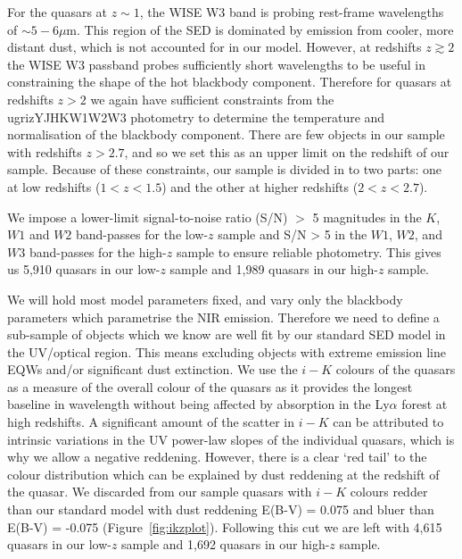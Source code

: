 For the quasars at $z \sim 1$, the WISE W3 band is probing rest-frame wavelengths of $\sim5-6\mu$m. 
This region of the \ac{SED} is dominated by emission from cooler, more distant dust, which is not accounted for in our model.
However, at redshifts $z \gtrsim 2$ the WISE W3 passband probes sufficiently short wavelengths to be useful in constraining the shape of the hot blackbody component. 
Therefore for quasars at redshifts $z > 2$ we again have sufficient constraints from the ugrizYJHKW1W2W3 photometry to determine the temperature and normalisation of the blackbody component. 
There are few objects in our sample with redshifts $z > 2.7$, and so we set this as an upper limit on the redshift of our sample. 
Because of these constraints, our sample is divided in to two parts: one at low redshifts ($1 < z < 1.5$) and the other at higher redshifts ($2 < z < 2.7$). 

We impose a lower-limit signal-to-noise ratio (S/N) $>$ 5 magnitudes in the $K$, $W1$ and $W2$ band-passes for the low-$z$ sample and S/N > 5 in the $W1$, $W2$, and $W3$ band-passes for the high-$z$ sample to ensure reliable photometry.
This gives us 5,910 quasars in our low-$z$ sample and 1,989 quasars in our high-$z$ sample. 

We will hold most model parameters fixed, and vary only the blackbody parameters which parametrise the NIR emission. 
Therefore we need to define a sub-sample of objects which we know are well fit by our standard SED model in the UV/optical region. 
This means excluding objects with extreme emission line \ac{EQW}s and/or significant dust extinction.
We use the $i-K$ colours of the quasars as a measure of the overall colour of the quasars as it provides the longest baseline in wavelength without being affected by absorption in the Ly$\alpha$ forest at high redshifts. 
A significant amount of the scatter in $i-K$ can be attributed to intrinsic variations in the UV power-law slopes of the individual quasars, which is why we allow a negative reddening. 
However, there is a clear `red tail' to the colour distribution which can be explained by dust reddening at the redshift of the quasar.
We discarded from our sample quasars with $i - K$ colours redder than our standard model with dust reddening E(B-V) = 0.075 and bluer than E(B-V) = -0.075 (Figure~\ref{fig:ikzplot}). 
Following this cut we are left with 4,615 quasars in our low-$z$ sample and 1,692 quasars in our high-$z$ sample. 


